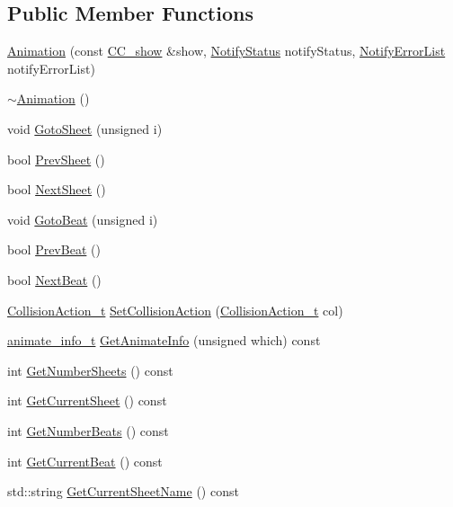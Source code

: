 \subsection*{Public Member Functions}
\begin{DoxyCompactItemize}
\item 
\hyperlink{a00010_a0469b77a735cccf19b3f068611a3bc59}{Animation} (const \hyperlink{a00046}{C\-C\-\_\-show} \&show, \hyperlink{a00195_aef08fe65401b34c561d7d6fc0ff39b60}{Notify\-Status} notify\-Status, \hyperlink{a00195_a9f9c725e3e1c76c65ddb676bf591d49b}{Notify\-Error\-List} notify\-Error\-List)
\item 
\hyperlink{a00010_a401b68793d4fbf48d481c030ee4b2a16}{$\sim$\-Animation} ()
\item 
void \hyperlink{a00010_a4002f343256ac4cd8d3380c0c1469f7e}{Goto\-Sheet} (unsigned i)
\item 
bool \hyperlink{a00010_ad21c5572e9ace3038eea38396490c58f}{Prev\-Sheet} ()
\item 
bool \hyperlink{a00010_aad0b053579fd437f731854a4a29d65fb}{Next\-Sheet} ()
\item 
void \hyperlink{a00010_ad8bfb6051a31076e99a0f9e61bd5b40c}{Goto\-Beat} (unsigned i)
\item 
bool \hyperlink{a00010_ae2733e6156063597977b48c695650de7}{Prev\-Beat} ()
\item 
bool \hyperlink{a00010_a2be557510614b62bfe39a6913ba1c9d4}{Next\-Beat} ()
\item 
\hyperlink{a00010_acf8ace9aee0e09e12c10002bcde0459c}{Collision\-Action\-\_\-t} \hyperlink{a00010_a6a76704f47af6f050fbfc3d7cd37953c}{Set\-Collision\-Action} (\hyperlink{a00010_acf8ace9aee0e09e12c10002bcde0459c}{Collision\-Action\-\_\-t} col)
\item 
\hyperlink{a00002}{animate\-\_\-info\-\_\-t} \hyperlink{a00010_addde584b88aff4f6ce2783471cf59b31}{Get\-Animate\-Info} (unsigned which) const 
\item 
int \hyperlink{a00010_a7440e14027f14c9327fd362e4645d7b4}{Get\-Number\-Sheets} () const 
\item 
int \hyperlink{a00010_ae09f383c81194e7fe5c06e85f91f7f4f}{Get\-Current\-Sheet} () const 
\item 
int \hyperlink{a00010_ac2d3c692da52a41140a81daeb95b8d72}{Get\-Number\-Beats} () const 
\item 
int \hyperlink{a00010_a2336103e6472cc869c8fa711620b23f7}{Get\-Current\-Beat} () const 
\item 
std\-::string \hyperlink{a00010_ad2de4217b9c101ff735ca02485f459ab}{Get\-Current\-Sheet\-Name} () const 

\end{DoxyCompactItemize}
